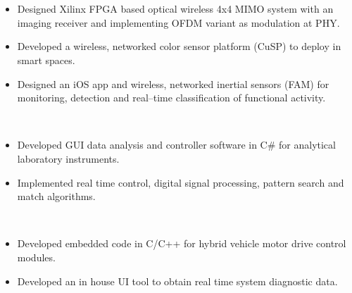 \vspace{0.05in}\\
\hfill {}\\
\begin{itemize}[noitemsep,topsep=0.25em,leftmargin=1.25em]
	\item Designed Xilinx FPGA based optical wireless 4x4 MIMO system with an imaging receiver and implementing OFDM variant as modulation at PHY.
	\item Developed a wireless, networked color sensor platform (CuSP) to deploy in smart spaces.
	\item Designed an iOS app and wireless, networked inertial sensors (FAM) for monitoring, detection and real--time classification of functional activity.
\end{itemize}
 \hfill {}\\
\begin{itemize}[noitemsep,topsep=0.25em,leftmargin=1.25em]
	\item Developed GUI data analysis and controller software in C\# for analytical laboratory instruments.
	\item Implemented real time control, digital signal processing, pattern search and match algorithms.
\end{itemize}
 \hfill {}\\
\begin{itemize}[noitemsep,topsep=0.25em,leftmargin=1.25em]
	\item Developed embedded code in C/C++ for hybrid vehicle motor drive control modules.
	\item Developed an in house UI tool to obtain real time system diagnostic data.
\end{itemize}

